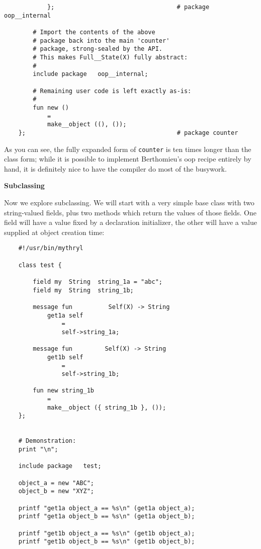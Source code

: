 \begin{verbatim}
            };                                  # package oop__internal

        # Import the contents of the above
        # package back into the main 'counter'
        # package, strong-sealed by the API.
        # This makes Full__State(X) fully abstract:
        #
        include package   oop__internal;

        # Remaining user code is left exactly as-is:
        # 
        fun new ()
            =
            make__object ((), ());
    };                                          # package counter
\end{verbatim}

As you can see, the fully expanded form of {\tt counter} is ten times longer 
than the class form;  while it is possible to implement Berthomieu's oop recipe 
entirely by hand, it is definitely nice to have the compiler do most of the 
busywork.

{\bf Subclassing}

Now we explore subclassing.  We will start with a very simple base 
class with two string-valued fields, plus two methods which return the 
values of those fields.  One field will have a value fixed by a declaration 
initializer, the other will have a value supplied at object creation time:

\begin{verbatim}
    #!/usr/bin/mythryl

    class test {

        field my  String  string_1a = "abc";
        field my  String  string_1b;

        message fun          Self(X) -> String
            get1a self
                =
                self->string_1a;

        message fun         Self(X) -> String
            get1b self
                =
                self->string_1b;

        fun new string_1b
            =
            make__object ({ string_1b }, ());
    };


    # Demonstration:
    print "\n";

    include package   test;

    object_a = new "ABC";
    object_b = new "XYZ";

    printf "get1a object_a == %s\n" (get1a object_a);
    printf "get1a object_b == %s\n" (get1a object_b);

    printf "get1b object_a == %s\n" (get1b object_a);
    printf "get1b object_b == %s\n" (get1b object_b);
\end{verbatim}

